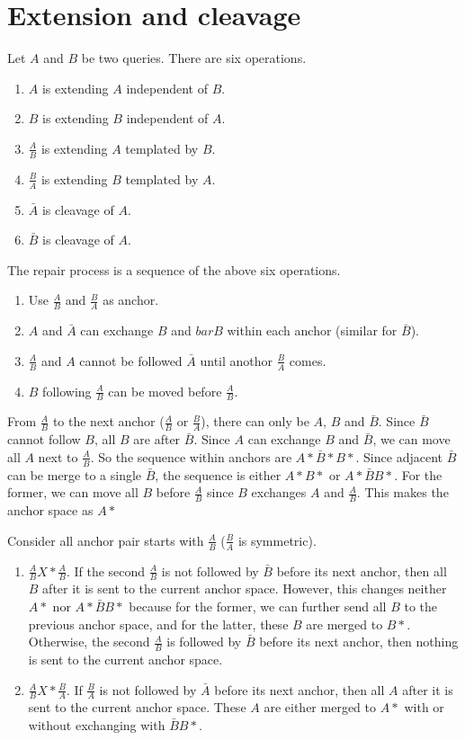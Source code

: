 \documentclass{article}
\begin{document}
\section{Extension and cleavage}

Let $A$ and $B$ be two queries. There are six operations.
\begin{enumerate}
\item $A$ is extending $A$ independent of $B$.
\item $B$ is extending $B$ independent of $A$.
\item $\frac{A}{B}$ is extending $A$ templated by $B$.
\item $\frac{B}{A}$ is extending $B$ templated by $A$.
\item $\bar{A}$ is cleavage of $A$.
\item $\bar{B}$ is cleavage of $A$.
\end{enumerate}

The repair process is a sequence of the above six operations.
\begin{enumerate}
\item Use $\frac{A}{B}$ and $\frac{B}{A}$ as anchor.
\item $A$ and $\bar{A}$ can exchange $B$ and $bar{B}$ within each anchor (similar for $\bar{B}$).
\item $\frac{A}{B}$ and $A$ cannot be followed $\bar{A}$ until anothor $\frac{B}{A}$ comes.
\item $B$ following $\frac{A}{B}$ can be moved before $\frac{A}{B}$.
\end{enumerate}

From $\frac{A}{B}$ to the next anchor ($\frac{A}{B}$ or $\frac{B}{A}$), there can only be $A$, $B$ and $\bar{B}$. Since $\bar{B}$ cannot follow $B$, all $B$ are after $\bar{B}$. Since $A$ can exchange $B$ and $\bar{B}$, we can move all $A$ next to $\frac{A}{B}$. So the sequence within anchors are $A*\bar{B}*B*$. Since adjacent $\bar{B}$ can be merge to a single $\bar{B}$, the sequence is either $A*B*$ or $A*\bar{B}B*$. For the former, we can move all $B$ before $\frac{A}{B}$ since $B$ exchanges $A$ and $\frac{A}{B}$. This makes the anchor space as $A*$

Consider all anchor pair starts with $\frac{A}{B}$ ($\frac{B}{A}$ is symmetric).
\begin{enumerate}
\item $\frac{A}{B}X*\frac{A}{B}$. If the second $\frac{A}{B}$ is not followed by $\bar{B}$ before its next anchor, then all $B$ after it is sent to the current anchor space. However, this changes neither $A*$ nor $A*\bar{B}B*$ because for the former, we can further send all $B$ to the previous anchor space, and for the latter, these $B$ are merged to $B*$. Otherwise, the second $\frac{A}{B}$ is followed by $\bar{B}$ before its next anchor, then nothing is sent to the current anchor space.
\item $\frac{A}{B}X*\frac{B}{A}$. If $\frac{B}{A}$ is not followed by $\bar{A}$ before its next anchor, then all $A$ after it is sent to the current anchor space. These $A$ are either merged to $A*$ with or without exchanging with $\bar{B}B*$.
\end{enumerate} 
\end{document}
